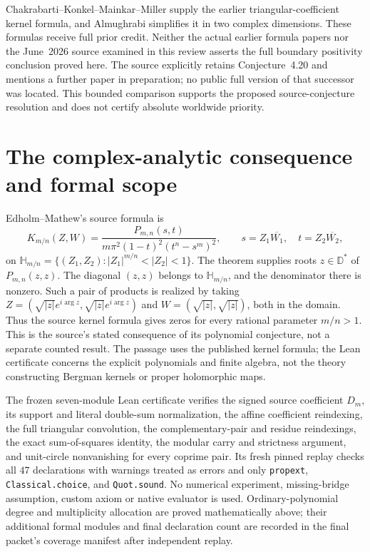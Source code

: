 \documentclass[11pt]{article}
\newcommand{\D}{\mathbb D}
\begin{document}
Chakrabarti--Konkel--Mainkar--Miller \cite{CKMM} supply the earlier
triangular-coefficient kernel formula, and Almughrabi \cite{Alm}
simplifies it in two complex dimensions. These formulas receive full
prior credit. Neither the actual earlier formula papers nor the
June~2026 source examined in this review asserts the full boundary
positivity conclusion proved here. The source explicitly retains
Conjecture~4.20 and mentions a further paper in preparation; no public
full version of that successor was located. This bounded comparison
supports the proposed source-conjecture resolution and does not certify
absolute worldwide priority.

\section{The complex-analytic consequence and formal scope}
Edholm--Mathew's source formula is
\[
 K_{m/n}(Z,W)=\frac{P_{m,n}(s,t)}{m\pi^2(1-t)^2(t^n-s^m)^2},
 \qquad s=Z_1\overline{W_1},\quad t=Z_2\overline{W_2},
\]
on $\mathbb H_{m/n}=\{(Z_1,Z_2):|Z_1|^{m/n}<|Z_2|<1\}$.
The theorem supplies roots $z\in\D^*$ of $P_{m,n}(z,z)$.
The diagonal $(z,z)$ belongs to $\mathbb H_{m/n}$, and the denominator
there is nonzero. Such a pair of products is realized by taking
$Z=(\sqrt{|z|}e^{i\arg z},\sqrt{|z|}e^{i\arg z})$ and
$W=(\sqrt{|z|},\sqrt{|z|})$, both in the domain.
Thus the source kernel formula gives zeros for every rational parameter
$m/n>1$. This is the source's stated consequence of its polynomial
conjecture, not a separate counted result. The passage uses the
published kernel formula; the Lean certificate concerns the explicit
polynomials and finite algebra, not the theory constructing Bergman
kernels or proper holomorphic maps.

The frozen seven-module Lean certificate verifies the signed source
coefficient $D_m$, its support and literal double-sum normalization,
the affine coefficient reindexing, the full triangular convolution,
the complementary-pair and residue reindexings, the exact
sum-of-squares identity, the modular carry and strictness argument, and
unit-circle nonvanishing for every coprime pair. Its fresh pinned replay
checks all $47$ declarations with warnings treated as errors and only
\texttt{propext}, \texttt{Classical.choice}, and \texttt{Quot.sound}.
No numerical experiment, missing-bridge assumption, custom axiom or
native evaluator is used. Ordinary-polynomial degree and multiplicity
allocation are proved mathematically above; their additional formal
modules and final declaration count are recorded in the final packet's
coverage manifest after independent replay.
\end{document}
